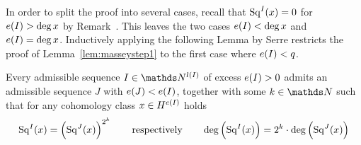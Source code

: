 In order to split the proof into several cases, recall that
$\mathrm{Sq}^{I}(x) = 0$ for $e(I)>\deg x$ by
Remark~. This leaves the two
cases $e(I)<\deg x$ and $e(I)=\deg x$.
Inductively applying the following Lemma by Serre restricts the
proof of Lemma~\ref{lem:masseystep1} to the first case where $e(I)<q$.
\begin{Lem}[Serre]
  \label{lem:serre}
  Every admissible sequence $I\in\Nat^{\l(I)}$ of excess $e(I)>0$
  admits an admissible sequence $J$ with $e(J)<e(I)$,
  together with some $k\in\Nat$
  such that for any cohomology class $x\in H^{e(I)}$ holds
  \begin{gather*}
    \mathrm{Sq}^{I}(x) = \left(\mathrm{Sq}^{J}(x)\right) ^{2^k}
    \qquad\text{respectively}\qquad
    \deg\left(\mathrm{Sq}^{I}(x)\right) = 2^k\cdot \deg\left(\mathrm{Sq}^{J}(x)\right)
  \end{gather*}
\end{Lem}

